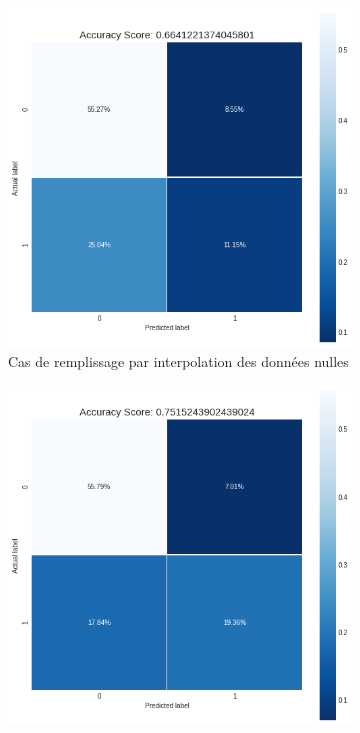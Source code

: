 \documentclass[12pt, a4paper]{article}
\begin{document}
    \begin{figure}[H]
     \centering
     \begin{subfigure}[b]{6.75cm}
           \centering
           \includegraphics[width=\textwidth]{images/confusion_matrix_decTree_case1.png}
           \caption{Cas de remplissage par interpolation des données nulles}
            \label{fig:decTree_corr_matrix_inter}
     \end{subfigure}
     \hfill
     \begin{subfigure}[b]{6.75cm}
            \centering
           \includegraphics[width=\textwidth]{images/confusion_matrix_decTree_case2.png}

\end{subfigure}
\end{figure}
\end{document}
